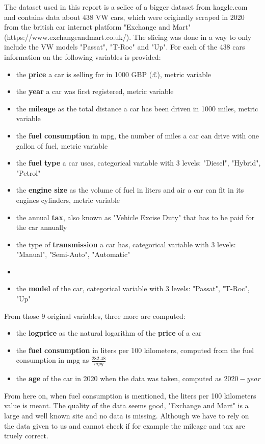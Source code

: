 \documentclass[12 pt]{scrartcl}
\begin{document}
The dataset used in this report is a sclice of a bigger dataset from kaggle.com and contains data about 438 VW cars, which were originally scraped in 2020 from the british car internet platform "Exchange and Mart" \citep{Exchangeandmart} (https://www.exchangeandmart.co.uk/). The slicing was done in a way to only include the VW models "Passat", "T-Roc" and "Up".
For each of the 438 cars information on the following variables is provided:
\begin{itemize}
  \item the \textbf{price} a car is selling for in 1000 GBP (£), metric variable
  \item the \textbf{year} a car was first registered, metric variable
  \item the \textbf{mileage} as the total distance a car has been driven in 1000 miles, metric variable
  \item the \textbf{fuel consumption} in mpg, the number of miles a car can drive with one gallon of fuel, metric variable
  \item the \textbf{fuel type} a car uses, categorical variable with 3 levels: "Diesel", "Hybrid", "Petrol"
  \item the \textbf{engine size} as the volume of fuel in liters and air a car can fit in its engines cylinders, metric variable
  \item the annual \textbf{tax}, also known as "Vehicle Excise Duty" that has to be paid for the car annually
  \item the type of \textbf{transmission} a car has, categorical variable with 3 levels: "Manual", "Semi-Auto", "Automatic"
  \item \item the \textbf{model} of the car, categorical variable with 3 levels: "Passat", "T-Roc", "Up"
\end{itemize}
From those 9 original variables, three more are computed:
\begin{itemize}
  \item the \textbf{logprice} as the natural logarithm of the \textbf{price} of a car
  \item the \textbf{fuel consumption} in liters per 100 kilometers, computed from the fuel consumption in mpg as $\frac{282.48}{mpg}$
  \item the \textbf{age} of the car in 2020 when the data was taken, computed as $2020-year$
\end{itemize}
From here on, when fuel consumption is mentioned, the liters per 100 kilometers value is meant.
The quality of the data seems good, "Exchange and Mart" is a large and well known site and no data is missing. Although we have to rely on the data given to us and cannot check if for example the mileage and tax are truely correct.
\end{document}
